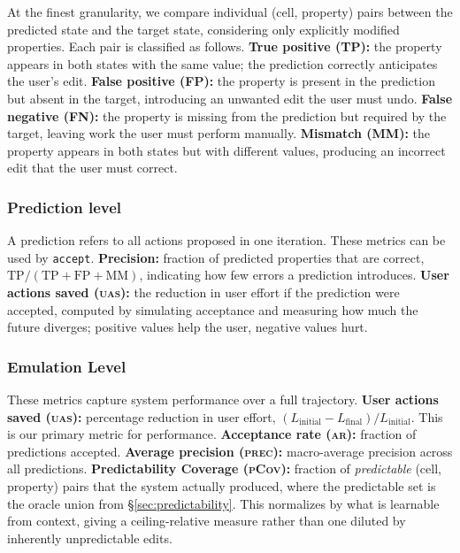 \documentclass{article}
\theoremstyle{plain}
\theoremstyle{definition}
\theoremstyle{remark}
\begin{document}
At the finest granularity, we compare individual (cell, property) pairs between the predicted state and the target state, considering only explicitly modified properties. Each pair is classified as follows. 
\textbf{True positive (TP):} the property appears in both states with the same value; the prediction correctly anticipates the user’s edit. 
\textbf{False positive (FP):} the property is present in the prediction but absent in the target, introducing an unwanted edit the user must undo. 
\textbf{False negative (FN):} the property is missing from the prediction but required by the target, leaving work the user must perform manually. 
\textbf{Mismatch (MM):} the property appears in both states but with different values, producing an incorrect edit that the user must correct.


\subsubsection{Prediction level}

A prediction refers to all actions proposed in one iteration.
These metrics can be used by \texttt{accept}. 
\textbf{Precision:} fraction of predicted properties that are correct, $\text{TP}/(\text{TP}+\text{FP}+\text{MM})$, indicating how few errors a prediction introduces. 
\textbf{User actions saved (\textsc{uas}):} the reduction in user effort if the prediction were accepted, computed by simulating acceptance and measuring how much the future diverges; positive values help the user, negative values hurt.

\subsubsection{Emulation Level}

These metrics capture system performance over a full trajectory. 
\textbf{User actions saved (\textsc{uas}):} percentage reduction in user effort, $(L_{\text{initial}} - L_{\text{final}})/L_{\text{initial}}$.  This is our primary metric for performance.
\textbf{Acceptance rate (\textsc{ar}):} fraction of predictions accepted. 
\textbf{Average precision (\textsc{prec}):} macro-average precision across all predictions. 
\textbf{Predictability Coverage (\textsc{pCov}):} fraction of \emph{predictable} (cell, property) pairs that the system actually produced, where the predictable set is the oracle union from \S\ref{sec:predictability}. This normalizes by what is learnable from context, giving a ceiling-relative measure rather than one diluted by inherently unpredictable edits.
\end{document}
